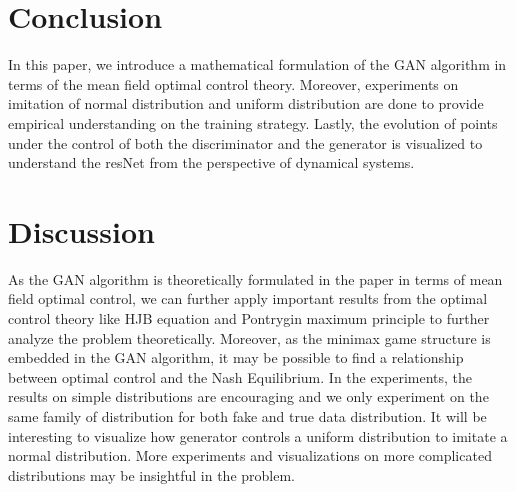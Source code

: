 \section{Conclusion}
In this paper, we introduce a mathematical formulation of the GAN algorithm in terms of the mean field optimal control theory. Moreover, experiments on imitation of normal distribution and uniform distribution are done to provide empirical understanding on the training strategy. Lastly, the evolution of points under the control of both the discriminator and the generator is visualized to understand the resNet from the perspective of dynamical systems.

\section{Discussion}
As the GAN algorithm is theoretically formulated in the paper in terms of mean field optimal control, we can further apply important results from the optimal control theory like HJB equation and Pontrygin maximum principle to further analyze the problem theoretically. Moreover, as the minimax game structure is embedded in the GAN algorithm, it may be possible to find a relationship between optimal control and the Nash Equilibrium. In the experiments, the results on simple distributions are encouraging and we only experiment on the same family of distribution for both fake and true data distribution. It will be interesting to visualize how generator controls a uniform distribution to imitate a normal distribution. More experiments and visualizations on more complicated distributions may be insightful in the problem. 